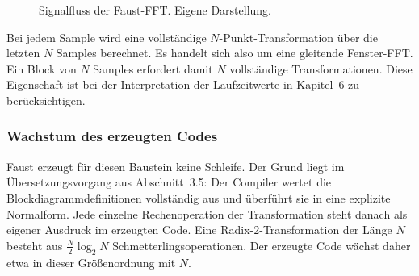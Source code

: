 \begin{figure}[htb]
\centering
{}
\caption{Signalfluss der Faust-FFT. Eigene Darstellung.}
\label{fig:fftfluss}
\end{figure}

Bei jedem Sample wird eine vollständige $N$-Punkt-Transformation über die
letzten $N$ Samples berechnet. Es handelt sich also um eine gleitende
Fenster-FFT. Ein Block von $N$ Samples erfordert damit $N$ vollständige
Transformationen. Diese Eigenschaft ist bei der Interpretation der
Laufzeitwerte in Kapitel~6 zu berücksichtigen.

\subsubsection*{Wachstum des erzeugten Codes}

Faust erzeugt für diesen Baustein keine Schleife. Der Grund liegt im
Übersetzungsvorgang aus Abschnitt~3.5: Der Compiler wertet die
Blockdiagrammdefinitionen vollständig aus und überführt sie in eine explizite
Normalform. Jede einzelne Rechenoperation der Transformation steht danach als
eigener Ausdruck im erzeugten Code. Eine Radix-2-Transformation der Länge $N$
besteht aus $\tfrac{N}{2}\log_2 N$ Schmetterlingsoperationen. Der erzeugte
Code wächst daher etwa in dieser Größenordnung mit $N$.

